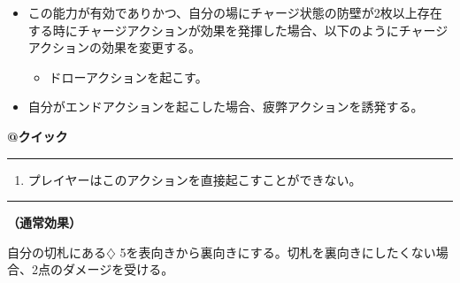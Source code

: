 \documentclass[twocolumn,a5paper,papersize,10pt]{jarticle}
\begin{document}
\vspace{-1zh}%
\begin{itemize}
\setlength{\leftskip}{-0.3cm}
\setlength{\parskip}{0pt} %

\item この能力が有効でありかつ、自分の場にチャージ状態の防壁が2枚以上存在する時にチャージアクションが効果を発揮した場合、以下のようにチャージアクションの効果を変更する。

\vspace{-1zh}%
\begin{itemize}
\setlength{\leftskip}{-0.3cm}
\setlength{\parskip}{0pt} %

\item ドローアクションを起こす。
\vspace{-1zh}%
\end{itemize}
\item 自分がエンドアクションを起こした場合、疲弊アクションを誘発する。
\vspace{-1zh}%
\end{itemize}

\begin{tcolorbox}[title={\small\bf【Action】疲弊}{\scriptsize （誘発）}]

{\scriptsize\bf @クイック }

\vspace{1mm} %
\hrule height 0.1mm depth 0mm width 62mm %
\vspace{1mm} %


\vspace{-1zh}%
\begin{enumerate}
\renewcommand{\labelenumi}{※}
\setlength{\leftskip}{-0.3cm}
\setlength{\itemsep}{0pt} %
\setlength{\parskip}{0pt} %

\item プレイヤーはこのアクションを直接起こすことができない。

\vspace{-3mm}%
\end{enumerate}
\vspace{-2mm} %
\vspace{1zh}%
\vspace{1mm} %
\hrule height 0.1mm depth 0mm width 62mm %
\vspace{1mm} %

{\bf（通常効果）}

自分の切札にある{\normalsize $\diamondsuit$} 5を表向きから裏向きにする。切札を裏向きにしたくない場合、2点のダメージを受ける。

\vspace{1mm} %
\end{tcolorbox}
\end{document}
